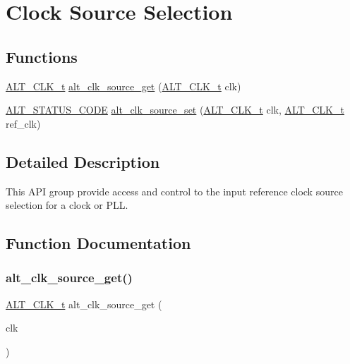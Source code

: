\hypertarget{group__CLK__MGR__CLK__SEL}{}\section{Clock Source Selection}
\label{group__CLK__MGR__CLK__SEL}
\subsection*{Functions}
\begin{DoxyCompactItemize}
\item 
\mbox{\hyperlink{group__CLK__MGR_ga4cdb80e84284365fe3d47c2f8050b13d}{A\+L\+T\+\_\+\+C\+L\+K\+\_\+t}} \mbox{\hyperlink{group__CLK__MGR__CLK__SEL_gaf739ec1ec11ec5d218eac1ce9e2d0406}{alt\+\_\+clk\+\_\+source\+\_\+get}} (\mbox{\hyperlink{group__CLK__MGR_ga4cdb80e84284365fe3d47c2f8050b13d}{A\+L\+T\+\_\+\+C\+L\+K\+\_\+t}} clk)
\item 
\mbox{\hyperlink{hwlib_8h_abdb0d369f069723ca55d6c94bcaaaa12}{A\+L\+T\+\_\+\+S\+T\+A\+T\+U\+S\+\_\+\+C\+O\+DE}} \mbox{\hyperlink{group__CLK__MGR__CLK__SEL_ga8eacc262142e216056ec1f0130d75d6f}{alt\+\_\+clk\+\_\+source\+\_\+set}} (\mbox{\hyperlink{group__CLK__MGR_ga4cdb80e84284365fe3d47c2f8050b13d}{A\+L\+T\+\_\+\+C\+L\+K\+\_\+t}} clk, \mbox{\hyperlink{group__CLK__MGR_ga4cdb80e84284365fe3d47c2f8050b13d}{A\+L\+T\+\_\+\+C\+L\+K\+\_\+t}} ref\+\_\+clk)
\end{DoxyCompactItemize}


\subsection{Detailed Description}
This A\+PI group provide access and control to the input reference clock source selection for a clock or P\+LL. 

\subsection{Function Documentation}
\mbox{\label{group__CLK__MGR__CLK__SEL_gaf739ec1ec11ec5d218eac1ce9e2d0406}} 
\subsubsection{\texorpdfstring{alt\_clk\_source\_get()}{alt\_clk\_source\_get()}}
{\footnotesize\ttfamily \mbox{\hyperlink{group__CLK__MGR_ga4cdb80e84284365fe3d47c2f8050b13d}{A\+L\+T\+\_\+\+C\+L\+K\+\_\+t}} alt\+\_\+clk\+\_\+source\+\_\+get (\begin{DoxyParamCaption}\item[{\mbox{\hyperlink{group__CLK__MGR_ga4cdb80e84284365fe3d47c2f8050b13d}{A\+L\+T\+\_\+\+C\+L\+K\+\_\+t}}}]{clk }\end{DoxyParamCaption})}

